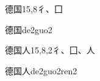 \begin{Entry}{德国}{15,8}{⼻、⼞}
  \begin{Phonetics}{德国}{de2guo2}
  \end{Phonetics}
\end{Entry}

\begin{Entry}{德国人}{15,8,2}{⼻、⼞、⼈}
  \begin{Phonetics}{德国人}{de2guo2ren2}
  \end{Phonetics}
\end{Entry}


